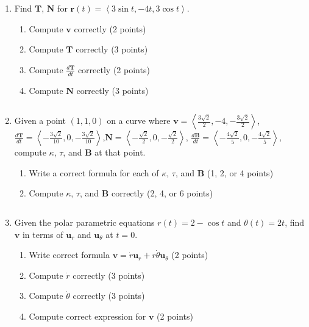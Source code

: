 \documentclass[12pt]{article}
\newcommand{\up}{$~$\vspace*{-0.7in}}
\newcommand{\liner}{\noindent\underline{\hspace*{7in}}}
\renewcommand{\vec}{\mathbf}
\newcommand{\<}{\left<}
\renewcommand{\>}{\right>}
\begin{document}
\begin{enumerate}



\item Find $\vec{T}$, $\vec{N}$ for $\vec{r}(t) = \left< 3\sin t, -4t, 3\cos t \right>$.

  \begin{enumerate}
    \item Compute $\vec{v}$ correctly (2 points)
    \item Compute $\vec{T}$ correctly (3 points)
    \item Compute $\frac{d\vec{T}}{dt}$ correctly (2 points)
    \item Compute $\vec{N}$ correctly (3 points)
  \end{enumerate}

\vspace*{8in}

\liner
\newpage\up


\item Given a point $(1,1,0)$ on a curve where $\vec{v}=\left< \frac{3\sqrt{2}}{2}, -4, -\frac{3\sqrt{2}}{2}\right>$, $\frac{d\vec{T}}{dt}=\left<-\frac{3\sqrt{2}}{10},0,-\frac{3\sqrt{2}}{10}\right>$,\newline $\vec{N}=\left<-\frac{\sqrt{2}}{2},0,-\frac{\sqrt{2}}{2}\right>$, $\frac{d\vec{B}}{dt}=\left<-\frac{4\sqrt{2}}{5},0,-\frac{4\sqrt{2}}{5}\right>$, compute $\kappa$, $\tau$, and $\vec{B}$ at that point.

  \begin{enumerate}
    \item Write a correct formula for each of $\kappa$, $\tau$, and $\vec{B}$ (1, 2, or 4 points)
    \item Compute $\kappa$, $\tau$, and $\vec{B}$ correctly (2, 4, or 6 points)
  \end{enumerate}

\vspace*{8in}

\liner

\newpage\up

\item Given the polar parametric equations $r(t)=2-\cos t$ and $\theta(t)=2t$, find $\vec{v}$ in terms of $\vec{u}_r$ and $\vec{u}_\theta$ at $t=0$.

  \begin{enumerate}
    \item Write correct formula $\vec{v} = \dot{r}\vec{u}_r + r\dot\theta\vec{u}_\theta$ (2 points)
    \item Compute $\dot{r}$ correctly (3 points)
    \item Compute $\dot{\theta}$ correctly (3 points)
    \item Compute correct expression for $\vec{v}$ (2 points)
  \end{enumerate}


\end{enumerate}
\end{document}
